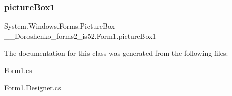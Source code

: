 \hypertarget{class__7___doroshenko__forms2__is52_1_1_form1_a933cbf3a176db517c87b626bd610c732}{}\label{class__7___doroshenko__forms2__is52_1_1_form1_a933cbf3a176db517c87b626bd610c732} 
\subsubsection{\texorpdfstring{picture\+Box1}{pictureBox1}}
{\footnotesize\ttfamily System.\+Windows.\+Forms.\+Picture\+Box \+\_\+\_\+\+Doroshenko\+\_\+forms2\+\_\+is52.\+Form1.\+picture\+Box1\hspace{0.3cm}{\ttfamily [private]}}



The documentation for this class was generated from the following files\+:\begin{DoxyCompactItemize}
\item 
\hyperlink{_form1_8cs}{Form1.\+cs}\item 
\hyperlink{_form1_8_designer_8cs}{Form1.\+Designer.\+cs}\end{DoxyCompactItemize}
